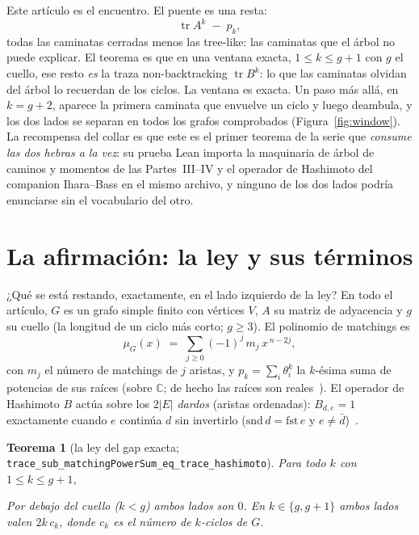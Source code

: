 \documentclass[11pt]{article}
\newtheorem{theorem}{Teorema}
\newcommand{\lean}[1]{\texttt{#1}}
\newcommand{\C}{\mathbb{C}}
\DeclareMathOperator{\tr}{tr}
\newcommand{\keyeq}[1]{\begin{center}\keybox{$\displaystyle #1$}\end{center}}
\begin{document}
Este artículo es el encuentro. El puente es una resta:
\[
\tr A^k \;-\; p_k,
\]
todas las caminatas cerradas menos las tree-like: las caminatas que el árbol no puede
explicar. El teorema es que en una ventana exacta, $1 \le k \le g+1$ con $g$ el cuello, ese
resto \emph{es} la traza non-backtracking $\tr B^k$: lo que las caminatas olvidan del árbol
lo recuerdan de los ciclos. La ventana es exacta. Un paso más allá, en $k = g+2$, aparece la
primera caminata que envuelve un ciclo y luego deambula, y los dos lados se separan en todos
los grafos comprobados (Figura~\ref{fig:window}). La recompensa del collar es que este es el
primer teorema de la serie que \emph{consume las dos hebras a la vez}: su prueba Lean
importa la maquinaria de árbol de caminos y momentos de las Partes~III--IV y el operador de
Hashimoto del companion Ihara--Bass en el mismo archivo, y ninguno de los dos lados podría
enunciarse sin el vocabulario del otro.

\section{La afirmación: la ley y sus términos}
\label{sec:claim}

¿Qué se está restando, exactamente, en el lado izquierdo de la ley? En todo el artículo,
$G$ es un grafo simple finito con vértices $V$, $A$ su matriz de adyacencia y $g$ su cuello (la longitud de un ciclo más corto; $g \ge 3$). El polinomio de
matchings es
\[
\mu_G(x) \;=\; \sum_{j \ge 0} (-1)^j\, m_j\, x^{\,n-2j},
\]
con $m_j$ el número de matchings de $j$ aristas, y $p_k = \sum_{i} \theta_i^k$ la $k$-ésima
suma de potencias de sus raíces (sobre $\C$; de hecho las raíces son
reales~\cite{HeilmannLieb1972,MarinHL2026}). El operador de Hashimoto $B$ actúa sobre los
$2|E|$ \emph{dardos} (aristas ordenadas): $B_{d,e} = 1$ exactamente cuando $e$ continúa $d$
sin invertirlo ($\mathrm{snd}\,d = \mathrm{fst}\,e$ y
$e \neq \bar d$)~\cite{Hashimoto1989,MarinBass2026}.

\begin{theorem}[la ley del gap exacta; \lean{trace\_sub\_matchingPowerSum\_eq\_trace\_hashimoto}]
\label{thm:gaplaw}
Para todo $k$ con $1 \le k \le g+1$,
\keyeq{\tr A^k \;-\; p_k \;=\; \tr B^k .}
Por debajo del cuello ($k < g$) ambos lados son $0$. En $k \in \{g, g+1\}$ ambos lados valen
$2k\,c_k$, donde $c_k$ es el número de $k$-ciclos de $G$.
\end{theorem}
\end{document}
